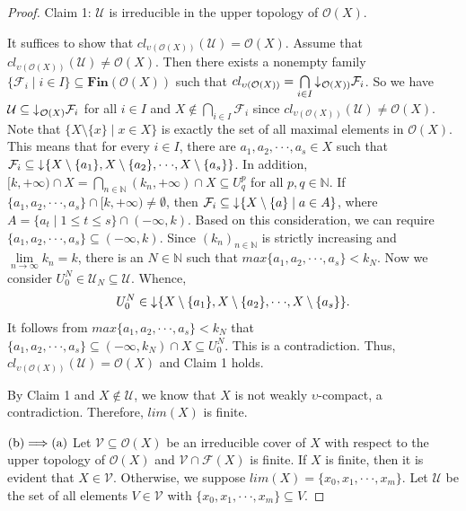 \documentclass[preprint,12pt]{elsarticle}
\numberwithin{equation}{section}
\newcommand{\dn}{\mathord{\downarrow}\hspace{0.05em}}
\begin{document}
\begin{proof}
 Claim 1: $\mathcal{U}$ is irreducible in the upper topology of $\mathcal{O}(X)$.

It suffices to show that $cl_{\upsilon(\mathcal{O}(X))}(\mathcal{U})=\mathcal{O}(X)$. Assume that $cl_{\upsilon(\mathcal{O}(X))}(\mathcal{U})\neq\mathcal{O}(X)$. Then there exists a nonempty family $\{\mathcal{F}_{i}\mid i\in I\}\subseteq\mathbf{Fin}(\mathcal{O}(X))$ such that $cl_{\upsilon(\mathcal{O}(X))}=\bigcap\limits_{i\in I}\dn_{\mathcal{O}(X))}\mathcal{F}_{i}$. So we have $\mathcal{U}\subseteq\dn_{\mathcal{O}(X)}\mathcal{F}_{i}$ for all $i\in I$ and $X\not\in\bigcap\limits_{i\in I}\mathcal{F}_{i}$ since $cl_{\upsilon(\mathcal{O}(X))}(\mathcal{U})\neq\mathcal{O}(X)$. Note that $\{X\setminus\{x\}\mid x\in X\}$ is exactly the set of all maximal elements in $\mathcal{O}(X)$. This means that for every $i\in I$, there are $a_{1},a_{2},\cdot\cdot\cdot,a_{s}\in X$ such that $\mathcal{F}_{i}\subseteq\dn\{X\setminus\{a_{1}\},X\setminus\{a_{2}\},\cdot\cdot\cdot,X\setminus\{a_{s}\}\}$. In addition, $[k,+\infty)\cap X=\bigcap\limits_{n\in \mathbb{N}}(k_{n},+\infty)\cap X\subseteq U^{p}_{q}$ for all $p,q\in\mathbb{N}$. If $\{a_{1},a_{2},\cdot\cdot\cdot,a_{s}\}\cap[k, +\infty)\neq\emptyset$, then $\mathcal{F}_{i}\subseteq\dn\{X\setminus\{a\}\mid a\in A\}$, where $A=\{a_{t}\mid 1\leq t\leq s\}\cap(-\infty,k)$. Based on this consideration, we can require $\{a_{1},a_{2},\cdot\cdot\cdot,a_{s}\}\subseteq(-\infty, k)$. Since $(k_{n})_{n\in\mathbb{\mathbb{N}}}$ is strictly increasing and $\lim\limits_{n\longrightarrow\infty}k_{n}=k$, there is an $N\in\mathbb{N}$ such that $max\{a_{1},a_{2},\cdot\cdot\cdot,a_{s}\}<k_{N}$. Now we consider $U^{N}_{0}\in\mathcal{U}_{N}\subseteq\mathcal{U}$. Whence, $$U^{N}_{0}\in\dn\{X\setminus\{a_{1}\},X\setminus\{a_{2}\},\cdot\cdot\cdot,X\setminus\{a_{s}\}\}.$$ It follows from $max\{a_{1},a_{2},\cdot\cdot\cdot,a_{s}\}<k_{N}$ that $\{a_{1},a_{2},\cdot\cdot\cdot,a_{s}\}\subseteq(-\infty,k_{N})\cap X\subseteq U^{N}_{0}$. This is a contradiction. Thus, $cl_{\upsilon(\mathcal{O}(X))}(\mathcal{U})=\mathcal{O}(X)$ and Claim 1 holds.

By Claim 1 and $X\not\in\mathcal{U}$, we know that $X$ is not weakly $\upsilon$-compact, a contradiction. Therefore, $lim(X)$ is finite.


${\rm (b)\Longrightarrow(a)}$ Let $\mathcal{V}\subseteq\mathcal{O}(X)$ be an irreducible cover of $X$ with respect to the upper topology of $\mathcal{O}(X)$ and $\mathcal{V}\cap\mathscr{F}(X)$ is finite. If $X$ is finite, then it is evident that $X\in\mathcal{V}$. Otherwise, we suppose $lim(X)=\{x_{0},x_{1},\cdot\cdot\cdot,x_{m}\}$. Let $\mathcal{U}$ be the set of all elements $V\in\mathcal{V}$ with $\{x_{0},x_{1},\cdot\cdot\cdot,x_{m}\}\subseteq V$.


\end{proof}
\end{document}
